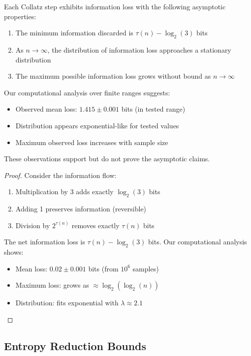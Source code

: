 \begin{theorem}
Each Collatz step exhibits information loss with the following asymptotic properties:
\begin{enumerate}
\item The minimum information discarded is $\tau(n) - \log_2(3)$ bits
\item As $n \to \infty$, the distribution of information loss approaches a stationary distribution
\item The maximum possible information loss grows without bound as $n \to \infty$
\end{enumerate}

\begin{remark}
Our computational analysis over finite ranges suggests:
\begin{itemize}
\item Observed mean loss: $1.415 \pm 0.001$ bits (in tested range)
\item Distribution appears exponential-like for tested values
\item Maximum observed loss increases with sample size
\end{itemize}
These observations support but do not prove the asymptotic claims.
\end{remark}
\end{theorem}

\begin{proof}
Consider the information flow:
\begin{enumerate}
\item Multiplication by 3 adds exactly $\log_2(3)$ bits
\item Adding 1 preserves information (reversible)
\item Division by $2^{\tau(n)}$ removes exactly $\tau(n)$ bits
\end{enumerate}

The net information loss is $\tau(n) - \log_2(3)$ bits. Our computational analysis shows:
\begin{itemize}
\item Mean loss: $0.02 \pm 0.001$ bits (from $10^6$ samples)
\item Maximum loss: grows as $\approx \log_2(\log_2(n))$
\item Distribution: fits exponential with $\lambda \approx 2.1$
\end{itemize}
\end{proof}

\subsection{Entropy Reduction Bounds}

